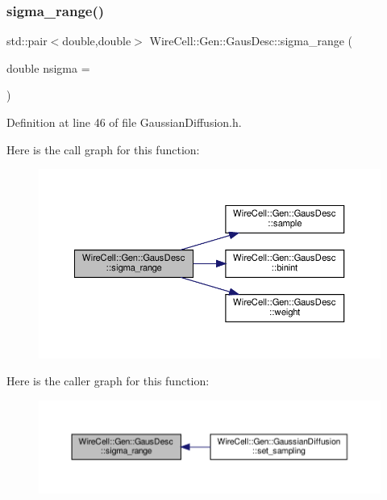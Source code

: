 \subsubsection{\texorpdfstring{sigma\+\_\+range()}{sigma\_range()}}
{\footnotesize\ttfamily std\+::pair$<$double,double$>$ Wire\+Cell\+::\+Gen\+::\+Gaus\+Desc\+::sigma\+\_\+range (\begin{DoxyParamCaption}\item[{double}]{nsigma = {} }\end{DoxyParamCaption})\hspace{0.3cm}{\ttfamily [inline]}}



Definition at line 46 of file Gaussian\+Diffusion.\+h.

Here is the call graph for this function\+:
\nopagebreak
\begin{figure}[H]
\begin{center}
\leavevmode
\includegraphics[width=350pt]{struct_wire_cell_1_1_gen_1_1_gaus_desc_a5340bfa4adeaccdcac2766ecd1b4a3b0_cgraph}
\end{center}
\end{figure}
Here is the caller graph for this function\+:
\nopagebreak
\begin{figure}[H]
\begin{center}
\leavevmode
\includegraphics[width=350pt]{struct_wire_cell_1_1_gen_1_1_gaus_desc_a5340bfa4adeaccdcac2766ecd1b4a3b0_icgraph}
\end{center}
\end{figure}
\mbox{\label{struct_wire_cell_1_1_gen_1_1_gaus_desc_aa7099866e931d552fead98c5fcfcefb8}} 
